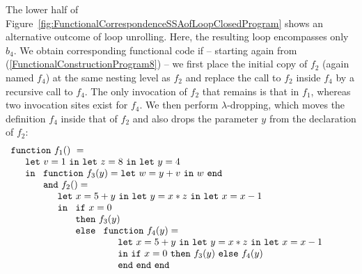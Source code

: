 The lower half of
Figure~\ref{fig:FunctionalCorrespondenceSSAofLoopClosedProgram} shows
an alternative outcome of loop unrolling. Here, the resulting loop
encompasses only $b_4$. We obtain corresponding functional code if --
starting again from (\ref{FunctionalConstructionProgram8}) -- we first
place the initial copy of $f_2$ (again named $f_4$) at the same
nesting level as $f_2$ and replace the call to $f_2$ inside $f_4$ by a
recursive call to $f_4$. The only invocation of $f_2$ that remains is
that in $f_1$, whereas two invocation sites exist for $f_4$. We then
perform $\lambda$-dropping, which moves the definition $f_4$ inside
that of $f_2$ and also drops the parameter $y$ from the declaration of
$f_2$:
\begin{equation}
\label{FunctionalConstructionProgram10}
\begin{array}{l}
\mathtt{function}\ f_1()\ = \\
  \quad
  \begin{array}{l}
     \mathtt{let}\ v = 1 \ 
     \mathtt{in\ let}\ z = 8 \ 
     \mathtt{in\ let}\ y = 4\\
     \mathtt{in}\ 
     \begin{array}[t]{l}
       \mathtt{function}\ f_3(y) = 
          \mathtt{let}\ w = y+v\ \mathtt{in}\ w\ \mathtt{end}\\
       \mathtt{and}\ f_2() =\\
         \quad
         \begin{array}{l}
           \mathtt{let}\ x = 5+y\
           \mathtt{in\ let}\ y = x*z\
           \mathtt{in\ let}\ x = x-1\\
           \mathtt{in}\
           \begin{array}[t]{l}
             \mathtt{if}\ x=0\\
             \mathtt{then}\ f_3(y)\\ 
             \mathtt{else}\
               \begin{array}[t]{l}
                 \mathtt{function}\ f_4(y) =\\
                 \quad
                 \begin{array}{l}
                   \mathtt{let}\ x = 5+y\
                   \mathtt{in\ let}\ y = x*z\
                   \mathtt{in\ let}\ x = x-1\\
                   \mathtt{in}\
                     \mathtt{if}\ x=0\
                     \mathtt{then}\ f_3(y)\ 
                     \mathtt{else}\ f_4(y)\\
                   \mathtt{end\ end\ end}

\end{array}
\end{array}
\end{array}
\end{array}
\end{array}
\end{array}
\end{array}
\end{equation}
